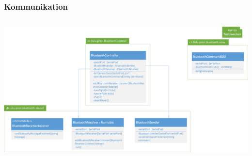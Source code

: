 \begin{frame}
    \frametitle{Kommunikation}
    \begin{columns}
        \begin{column}{1\textwidth}
            \centering
            \includegraphics[width=1.0\textwidth]{../fig/Klassendiagramm_Bluetoothmodul.png}
        \end{column}
    \end{columns}
\end{frame}

